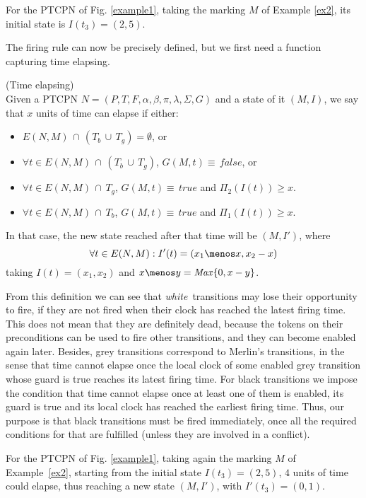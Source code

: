{\bex\label{ex3} For the PTCPN of Fig. \ref{example1}, taking the
marking $M$ of  Example \ref{ex2}, its initial  state is
\quad \(I(t_3)=(2,5)\).
\eex

The firing rule can now be precisely defined, but we first need a
function capturing time elapsing.

\bdfn (Time elapsing)\\
Given a PTCPN $N=(P,T,F,\alpha,\beta,\pi,\lambda,\Sigma, G)$ and a
state of it $(M,I)$, we say that $x$ units of time can elapse if
either:
\begin{itemize}
\item  $E(N,M)\,\cap\,(T_b\,\cup\, T_g)=\emptyset$, or
\item  $\forall t \in E(N,M)\,\cap\,(T_b\,\cup\, T_g)$, $G(M,t) \equiv\, false$, or
\item $\forall t \in  E(N,M)\,\cap\,T_g$, $G(M,t) \equiv\, true$ and  $\Pi_2(I(t)) \geq x$.
\item $\forall t \in  E(N,M)\,\cap\,T_b$, $G(M,t) \equiv\, true$ and  $\Pi_1(I(t)) \geq x$.
 \end{itemize}
%
%
In that case, the new state reached after that time will be
$(M,I')$, where
%
\[ \forall t \in E(N,M):
I'(t) = (x_1\menos x, x_2-x) \]
%
taking $I(t)=(x_1, x_2)$ and $x
\menos y = {\it Max} \{0, x - y\}$.
\edfn

From this definition we can see that {\em white\,} transitions may
lose their opportunity to fire, if they are not fired when their
clock has reached the latest firing time. This does not mean that
they are definitely dead, because the tokens on their preconditions
can be used to fire other transitions, and they can become enabled
again later. Besides, grey transitions correspond to  Merlin's
transitions, in the sense that time cannot elapse once the local
clock of some enabled grey transition whose guard is true reaches
its latest firing time. For black transitions we impose the
condition that time cannot elapse once at least one of them is
enabled, its guard is true and its local clock has reached the
earliest firing time. Thus, our purpose is that black transitions
must be fired immediately, once all the required conditions for that
are fulfilled (unless they are involved in a conflict).

\bex\label{ex4} For the PTCPN of Fig. \ref{example1}, taking again
the marking $M$ of  \mbox{Example \ref{ex2},} starting  from the
initial state\; \(I(t_3)=(2,5)\),  $4$ units of time could elapse,
thus reaching a new state $(M,I')$, with  \(I'(t_3)=(0,1)\).
%
\eex

}
